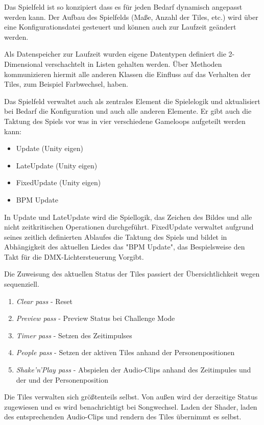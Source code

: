 
Das Spielfeld ist so konzipiert dass es für jeden Bedarf dynamisch angepasst werden kann. Der Aufbau des Spielfelds (Maße, Anzahl der Tiles, etc.) wird über eine Konfigurationsdatei gesteuert und können auch zur Laufzeit geändert werden.

Als Datenspeicher zur Laufzeit wurden eigene Datentypen definiert die 2-Dimensional verschachtelt in Listen gehalten werden. Über Methoden kommunizieren hiermit alle anderen Klassen die Einfluss auf das Verhalten der Tiles, zum Beispiel Farbwechsel, haben.

Das Spielfeld verwaltet auch als zentrales Element die Spielelogik und aktualisiert bei Bedarf die Konfiguration und auch alle anderen Elemente. Er gibt auch die Taktung des Spiels vor was in vier verschiedene Gameloops aufgeteilt werden kann:
\begin{itemize}
\item Update (Unity eigen)
\item LateUpdate (Unity eigen)
\item FixedUpdate (Unity eigen)
\item BPM Update
\end{itemize}

In Update und LateUpdate wird die Spiellogik, das Zeichen des Bildes und alle nicht zeitkritischen Operationen durchgeführt.
FixedUpdate verwaltet aufgrund seines zeitlich definierten Ablaufes die Taktung des Spiels und bildet in Abhängigkeit des aktuellen Liedes das "BPM Update", das Bespielsweise den Takt für die DMX-Lichtersteuerung Vorgibt.

Die Zuweisung des aktuellen Status der Tiles passiert der Übersichtlichkeit wegen sequenziell.
\begin{enumerate}
\item \emph{Clear pass} - Reset
\item \emph{Preview pass} - Preview Status bei Challenge Mode
\item \emph{Timer pass} - Setzen des Zeitimpulses
\item \emph{People pass} - Setzen der aktiven Tiles anhand der Personenpositionen
\item \emph{Shake'n'Play pass} - Abspielen der Audio-Clips anhand des Zeitimpules und der und der Personenposition
\end{enumerate}

Die Tiles verwalten sich größtenteils selbst. Von außen wird der derzeitige Status zugewiesen und es wird benachrichtigt bei Songwechsel. Laden der Shader, laden des entsprechenden Audio-Clips und rendern des Tiles übernimmt es selbst.